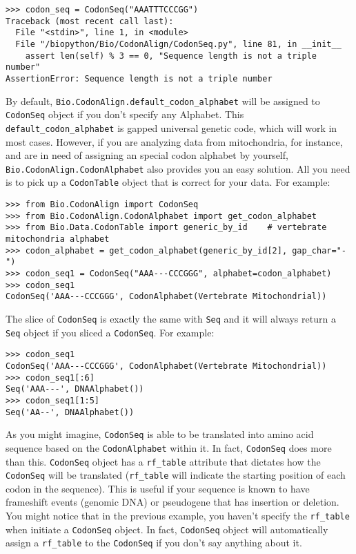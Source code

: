\begin{verbatim}
>>> codon_seq = CodonSeq("AAATTTCCCGG")
Traceback (most recent call last):
  File "<stdin>", line 1, in <module>
  File "/biopython/Bio/CodonAlign/CodonSeq.py", line 81, in __init__
    assert len(self) % 3 == 0, "Sequence length is not a triple number"
AssertionError: Sequence length is not a triple number
\end{verbatim}

By default, \verb|Bio.CodonAlign.default_codon_alphabet| will be
assigned to \verb|CodonSeq| object if you don't specify any Alphabet.
This \verb|default_codon_alphabet| is gapped universal genetic code,
which will work in most cases. However, if you are analyzing data from
mitochondria, for instance, and are in need of assigning an special
codon alphabet by yourself, \verb|Bio.CodonAlign.CodonAlphabet| also
provides you an easy solution. All you need is to pick up a
\verb|CodonTable| object that is correct for your data. For example:

\begin{verbatim}
>>> from Bio.CodonAlign import CodonSeq
>>> from Bio.CodonAlign.CodonAlphabet import get_codon_alphabet
>>> from Bio.Data.CodonTable import generic_by_id    # vertebrate mitochondria alphabet
>>> codon_alphabet = get_codon_alphabet(generic_by_id[2], gap_char="-")
>>> codon_seq1 = CodonSeq("AAA---CCCGGG", alphabet=codon_alphabet)
>>> codon_seq1
CodonSeq('AAA---CCCGGG', CodonAlphabet(Vertebrate Mitochondrial))
\end{verbatim}

The slice of \verb|CodonSeq| is exactly the same with \verb|Seq| and
it will always return a \verb|Seq| object if you sliced a
\verb|CodonSeq|. For example:

\begin{verbatim}
>>> codon_seq1
CodonSeq('AAA---CCCGGG', CodonAlphabet(Vertebrate Mitochondrial))
>>> codon_seq1[:6]
Seq('AAA---', DNAAlphabet())
>>> codon_seq1[1:5]
Seq('AA--', DNAAlphabet())
\end{verbatim}

As you might imagine, \verb|CodonSeq| is able to be translated into
amino acid sequence based on the \verb|CodonAlphabet| within it. In
fact, \verb|CodonSeq| does more than this. \verb|CodonSeq| object
has a \texttt{rf\_table} attribute that dictates how the
\verb|CodonSeq| will be translated (\texttt{rf\_table} will indicate
the starting position of each codon in the sequence). This is useful if
your sequence is known to have frameshift events (genomic DNA) or
pseudogene that has insertion or deletion. You might notice that in the
previous example, you haven't specify the \texttt{rf\_table} when initiate
a \verb|CodonSeq| object. In fact, \verb|CodonSeq| object will
automatically assign a \texttt{rf\_table} to the \texttt{CodonSeq} if
you don't say anything about it.


